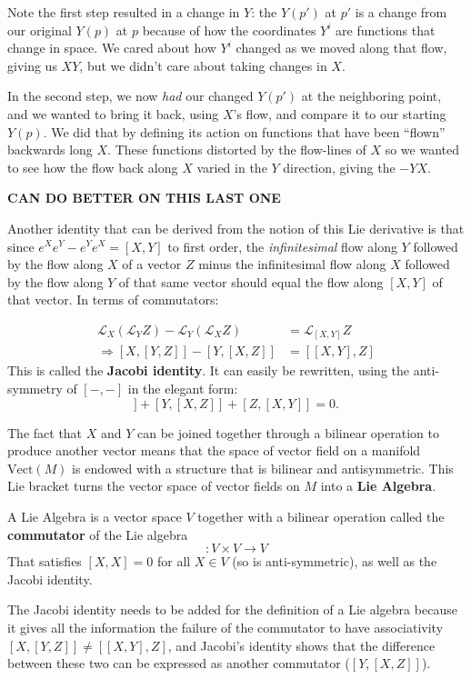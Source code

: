 		Note the first step resulted in a change in $Y$: the $Y(p')$ at $p'$ is a change from our original $Y(p)$ at $p$ because of how the coordinates $Y^i$ are functions that change in space. We cared about how $Y^i$ changed as we moved along that flow, giving us $XY$, but we didn't care about taking changes in $X$. 
		
		In the second step, we now \emph{had} our changed $Y(p')$ at the neighboring point, and we wanted to bring it back, using $X$'s flow, and compare it to our starting $Y(p)$. We did that by defining its action on functions that have been ``flown'' backwards long $X$. These functions distorted by the flow-lines of $X$ so we wanted to see how the flow back along $X$ varied in the $Y$ direction, giving the $-YX$. 
		
		\textbf{CAN DO BETTER ON THIS LAST ONE}
		
		Another identity that can be derived from the notion of this Lie derivative is that since $e^{X} e^{Y} - e^{Y} e^{X} = [X,Y]$ to first order, the \emph{infinitesimal} flow along $Y$ followed by the flow along $X$ of a vector $Z$ minus the infinitesimal flow along $X$ followed by the flow along $Y$ of that same vector should equal the flow along $[X,Y]$ of that vector. In terms of commutators:
		
		\begin{align}
			\mathcal L_X (\mathcal L_Y Z) - \mathcal L_Y (\mathcal L_X Z) &= \mathcal L_{[X,Y]} Z 
			\\ \Rightarrow [X,[Y,Z]] - [Y,[X,Z]] &= [[X,Y],Z]
		\end{align}
		This is called the \textbf{Jacobi identity}. It can easily be rewritten, using the anti-symmetry of $[-,-]$ in the elegant form:
		\begin{equation*}
			[X, [Y,Z]] + [Y, [X,Z]] + [Z, [X,Y]] = 0.
		\end{equation*}
		
		The fact that $X$ and $Y$ can be joined together through a bilinear operation to produce another vector means that the space of vector field on a manifold $\text{Vect}(M)$ is endowed with a structure that is bilinear and antisymmetric. This Lie bracket turns the vector space of vector fields on $M$ into a \textbf{Lie Algebra}.
		\begin{defn}
			A Lie Algebra is a vector space $V$ together with a bilinear operation called the \textbf{commutator} of the Lie algebra
			\begin{equation*}
				[-,-]: V \times V \rightarrow V
			\end{equation*}
			That satisfies $[X, X] = 0$ for all $X \in V$ (so is anti-symmetric), as well as the Jacobi identity. 
		\end{defn} 
		The Jacobi identity needs to be added for the definition of a Lie algebra because it gives all the information the failure of the commutator to have associativity $[X,[Y,Z]] \neq [[X,Y],Z]$, and Jacobi's identity shows that the difference between these two can be expressed as another commutator ($[Y,[X,Z]]$).
		
